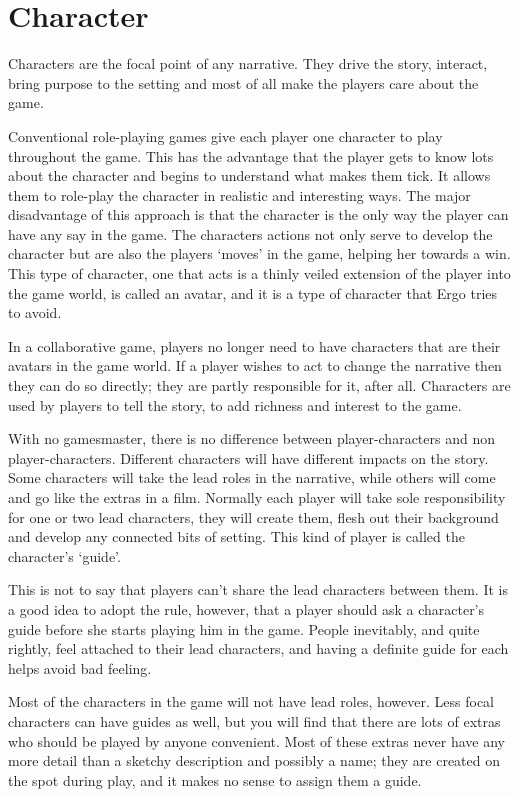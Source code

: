 \documentclass[twoside]{book}
\begin{document}
\section{Character}

Characters are the focal point of any narrative. They drive the story,
interact, bring purpose to the setting and most of all make the
players care about the game.

Conventional role-playing games give each player one character to play
throughout the game. This has the advantage that the player gets to
know lots about the character and begins to understand what makes them
tick. It allows them to role-play the character in realistic and
interesting ways. The major disadvantage of this approach is that the
character is the only way the player can have any say in the game. The
characters actions not only serve to develop the character but are
also the players `moves' in the game, helping her towards a win. This
type of character, one that acts is a thinly veiled extension of the
player into the game world, is called an avatar, and it is a type of
character that Ergo tries to avoid.

In a collaborative game, players no longer need to have characters
that are their avatars in the game world. If a player wishes to act to
change the narrative then they can do so directly; they are partly
responsible for it, after all. Characters are used by players to tell
the story, to add richness and interest to the game.

With no gamesmaster, there is no difference between player-characters
and non player-characters. Different characters will have different
impacts on the story. Some characters will take the lead roles in the
narrative, while others will come and go like the extras in a
film. Normally each player will take sole responsibility for one or
two lead characters, they will create them, flesh out their background
and develop any connected bits of setting. This kind of player is
called the character's `guide'.

This is not to say that players can't share the lead characters
between them. It is a good idea to adopt the rule, however, that a
player should ask a character's guide before she starts playing him in
the game. People inevitably, and quite rightly, feel attached to their
lead characters, and having a definite guide for each helps avoid bad
feeling.

Most of the characters in the game will not have lead roles,
however. Less focal characters can have guides as well, but you will
find that there are lots of extras who should be played by anyone
convenient. Most of these extras never have any more detail than a
sketchy description and possibly a name; they are created on the spot
during play, and it makes no sense to assign them a guide.
\end{document}
